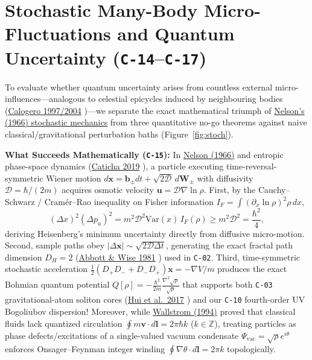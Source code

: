 \documentclass[11pt,letterpaper]{article}
\begin{document}
\section{Stochastic Many-Body Micro-Fluctuations and Quantum Uncertainty (\texttt{C-14}--\texttt{C-17})}

To evaluate whether quantum uncertainty arises from countless external micro-influences---analogous to celestial epicycles induced by neighbouring bodies (\href{https://www.worldscientific.com/doi/abs/10.1142/S0217979204024136}{Calogero 1997/2004} \cite{Calogero2004})---we separate the exact mathematical triumph of \href{https://link.aps.org/doi/10.1103/PhysRev.150.1079}{Nelson's (1966) stochastic mechanics} \cite{Nelson1966} from three quantitative no-go theorems against naive classical/gravitational perturbation baths (Figure~\ref{fig:stoch}).

\textbf{What Succeeds Mathematically (\texttt{C-15}):} In \href{https://link.aps.org/doi/10.1103/PhysRev.150.1079}{Nelson (1966)} \cite{Nelson1966} and entropic phase-space dynamics (\href{https://pmc.ncbi.nlm.nih.gov/articles/PMC7514274/}{Caticha 2019} \cite{EntropicQM2020}), a particle executing time-reversal-symmetric Wiener motion $d\mathbf{x} = \mathbf{b}_\pm dt + \sqrt{2\mathcal{D}}\,d\mathbf{W}_\pm$ with diffusivity $\mathcal{D} = \hbar/(2m)$ acquires osmotic velocity $\mathbf{u} = \mathcal{D}\nabla\ln\rho$. First, by the Cauchy--Schwarz / Cram\'er--Rao inequality on Fisher information $I_F = \int (\partial_x\ln\rho)^2\rho\,dx$,
\begin{equation}
  (\Delta x)^2 (\Delta p_u)^2 = m^2 \mathcal{D}^2 \mathrm{Var}(x)\,I_F(\rho) \ge m^2 \mathcal{D}^2 = \frac{\hbar^2}{4},
  \label{eq:cramer_rao}
\end{equation}
deriving Heisenberg's minimum uncertainty directly from diffusive micro-motion. Second, sample paths obey $|\Delta\mathbf{x}| \sim \sqrt{2\mathcal{D}\Delta t}$, generating the exact fractal path dimension $D_H = 2$ (\href{https://pubs.aip.org/aapt/ajp/article/49/1/37/1051491/Dimension-of-a-quantum-mechanical-path}{Abbott \& Wise 1981} \cite{AbbottWise1981}) used in \texttt{C-02}. Third, time-symmetric stochastic acceleration $\frac{1}{2}(D_+ D_- + D_- D_+)\mathbf{x} = -\nabla V / m$ produces the exact Bohmian quantum potential $Q[\rho] = -\frac{\hbar^2}{2m}\frac{\nabla^2\sqrt{\rho}}{\sqrt{\rho}}$ that supports both \texttt{C-03} gravitational-atom soliton cores (\href{https://link.aps.org/doi/10.1103/PhysRevD.95.043541}{Hui et al.\ 2017} \cite{Hui2017}) and our \texttt{C-10} fourth-order UV Bogoliubov dispersion! Moreover, while \href{https://link.aps.org/doi/10.1103/PhysRevA.49.1613}{Wallstrom (1994)} \cite{Wallstrom1994} proved that classical fluids lack quantized circulation $\oint m\mathbf{v}\cdot d\mathbf{l} = 2\pi\hbar k$ ($k\in\mathbb{Z}$), treating particles as phase defects/excitations of a single-valued vacuum condensate $\Psi_{\mathrm{vac}} = \sqrt{\rho}e^{i\theta}$ enforces Onsager--Feynman integer winding $\oint\nabla\theta\cdot d\mathbf{l} = 2\pi k$ topologically.
\end{document}

